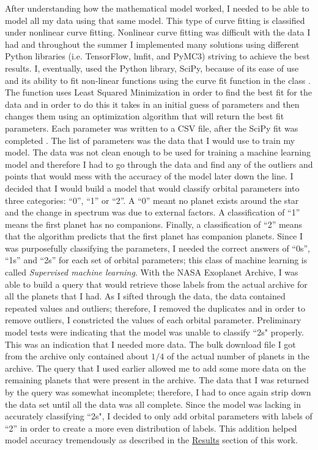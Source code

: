 \documentclass[12pt]{article}
\begin{document}
\par
After understanding how the mathematical model worked, I needed to be able to model all my data using that same model. This type of curve fitting is classified under nonlinear curve fitting. Nonlinear curve fitting was difficult with the data I had and throughout the summer I implemented many solutions using different Python libraries (i.e. TensorFlow, lmfit, and PyMC3) striving to achieve the best results. I, eventually, used the Python library, SciPy, because of its ease of use and its ability to fit non-linear functions using the curve fit function in the {\selectfont{scipy.optimize}} class \cite{scipy} . The function uses Least Squared Minimization in order to find the best fit for the data and in order to do this it takes in an initial guess of parameters and then changes them using an optimization algorithm that will return the best fit parameters. Each parameter was written to a CSV file, after the SciPy fit was completed \cite{scipy}. The list of parameters was the data that I would use to train my model. The data was not clean enough to be used for training a machine learning model and therefore I had to go through the data and find any of the outliers and points that would mess with the accuracy of the model later down the line. I decided that I would build a model that would classify orbital parameters into three categories: “0”, “1” or “2”. A “0” meant no planet exists around the star and the change in spectrum was due to external factors. A classification of “1” means the first planet has no companions. Finally, a classification of  “2” means that the algorithm predicts that the first planet has companion planets. Since I was purposefully classifying the parameters, I needed the correct answers of “0s”, “1s” and “2s” for each set of orbital parameters; this class of machine learning is called \emph{Supervised machine learning}. With the NASA Exoplanet Archive, I was able to build a query that would retrieve those labels from the actual archive for all the planets that I had. As I sifted through the data, the data contained repeated values and outliers; therefore, I removed the duplicates and in order to remove outliers, I constricted the values of each orbital parameter. Preliminary model tests were indicating that the model was unable to classify “2s" properly. This was an indication that I needed more data. The bulk download file I got from the archive only contained about $1/4$ of the actual number of planets in the archive. The query that I used earlier allowed me to add some more data on the remaining planets that were present in the archive. The data that I was returned by the query was somewhat incomplete; therefore, I had to once again strip down the data set until all the data was all complete. Since the model was lacking in accurately classifying “2s", I decided to only add orbital parameters with labels of “2” in order to create a more even distribution of labels. This addition helped model accuracy tremendously as described in the \hyperref[sec:results]{Results} section of this work.
\end{document}
